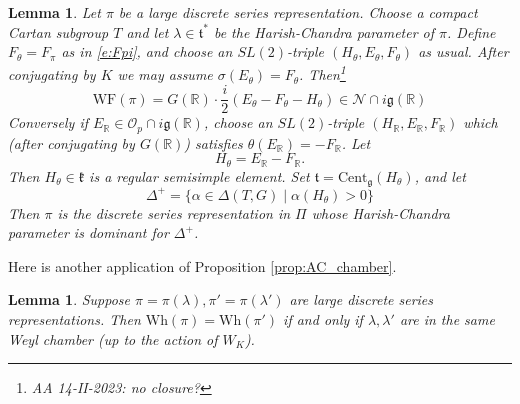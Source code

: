 \documentclass[10pt,leqno]{article}
\newtheorem{lemma}[equation]{Lemma}
\newcommand{\Cent}{\mathrm{Cent}}
\renewcommand{\O}{\mathcal O}
\newcommand{\R}{\mathbb R}
\newcommand{\N}{\mathcal N}
\renewcommand{\k}{\mathfrak k}
\renewcommand{\t}{\mathfrak t}
\newcommand{\g}{\mathfrak g}
\newcommand{\Wh}{\mathrm{Wh}}
\newcommand{\WF}{\mathrm{WF}}
\newcommand{\Op}{\O_p}
\begin{document}
\begin{lemma}
  Let $\pi$ be a large discrete series representation.
Choose a compact Cartan subgroup $T$ and let $\lambda\in \t^*$ be the Harish-Chandra parameter of $\pi$.
Define $F_\theta=F_\pi$ as in \eqref{e:Fpi}, and choose an $SL(2)$-triple $(H_\theta,E_\theta,F_\theta)$ as usual.
After conjugating by $K$ we may assume $\sigma(E_\theta)=F_\theta$.  Then\footnote{AA 14-II-2023: no closure?}
$$
\WF(\pi)=G(\R)\cdot\frac i2(E_\theta-F_\theta-H_\theta)\in\N\cap i\g(\R)
$$
Conversely if $E_\R\in \Op\cap i\g(\R)$, choose an $SL(2)$-triple $(H_\R,E_\R,F_\R)$ which (after conjugating by $G(\R)$) satisfies $\theta(E_\R)=-F_\R$.
Let
$$
H_\theta=E_\R-F_\R.
$$
Then $H_\theta\in\k$ is a regular semisimple element.
Set $\t=\Cent_{\g}(H_\theta)$, and let
$$
\Delta^+=\{\alpha\in\Delta(T,G)\mid  \alpha(H_\theta)>0\}
$$
Then $\pi$ is the discrete series representation in $\Pi$ whose Harish-Chandra parameter is dominant for $\Delta^+$. 
\end{lemma}

Here is another application of Proposition \ref{prop:AC_chamber}.

\begin{lemma}
\label{l:equalWhittaker}
Suppose $\pi=\pi(\lambda),\pi'=\pi(\lambda')$ are large discrete series
representations. Then $\Wh(\pi)=\Wh(\pi')$ if and only if
$\lambda,\lambda'$ are in the same Weyl chamber (up to the action of
$W_K$).
\end{lemma}
\end{document}
